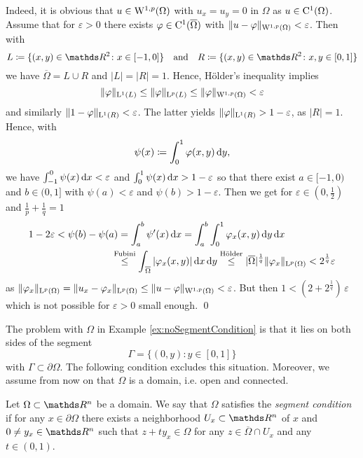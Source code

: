 \begin{ex}[Exercise]
  Indeed, it is obvious that $u \in \mathrm{W}^{1,p}(\Omega)$ with $u_x = u_y = 0$ in $\Omega$ as $u \in \mathrm{C}^1(\Omega)$.
  Assume that for $\varepsilon > 0$ there exists $\varphi \in \mathrm{C}^1(\overline\Omega)$ with $\| u - \varphi\|_{\mathrm{W}^{1,p}(\Omega)} < \varepsilon$.
  Then with
    $$
    L \coloneqq \{ (x,y) \in \R^2 \colon x \in [-1,0] \} \quad\text{and}\quad
    R \coloneqq \{ (x,y) \in \R^2 \colon x, y \in [0,1] \}
    $$
    we have $\overline\Omega = L \cup R$ and $|L| = |R| = 1$.
    Hence, Hölder's inequality implies
    $$
    \|\varphi\|_{\mathrm{L}^1(L)} 
    \leq \|\varphi\|_{\mathrm{L}^p(L)}
    \leq \|\varphi\|_{\mathrm{W}^{1,p}(\Omega)}
    < \varepsilon
    $$
    and similarly $\|1 - \varphi\|_{\mathrm{L}^1(R)} < \varepsilon$.
    The latter yields $\|\varphi\|_{\mathrm{L}^1(R)} > 1 - \varepsilon$, as $|R| = 1$.
    Hence, with
    $$
    \psi(x) \coloneqq \int_0^1 \varphi(x,y) \, {\operatorname{d}\!{y}},
    $$
    we have $\int_{-1}^0 \psi(x) \, {\operatorname{d}\!{x}} < \varepsilon$ and $\int_0^1 \psi(x) \, {\operatorname{d}\!{x}} > 1 - \varepsilon$ so that there exist $a \in [-1,0)$ and $b \in (0,1]$ with $\psi(a) < \varepsilon$ and $\psi(b) > 1 - \varepsilon$.
    Then we get for $\varepsilon \in (0,\frac{1}{2})$ and $\frac{1}{p} + \frac{1}{q} = 1$
    \begin{align*}
      1 - 2\varepsilon
      < \psi(b) - \psi(a)
      &= \int_a^b \psi'(x) \d x
      =\int_a^b \int_0^1 \varphi_x(x,y) \d y \d x \\
      &\hspace{-0.7em}\overset{\text{Fubini}}{\leq} \int_{\,\overline\Omega} |\varphi_x (x,y)| \d x \d y
      \overset{\text{Hölder}}{\leq} |\overline\Omega|^{\frac{1}{q}} \|\varphi_x\|_{\Ell^p(\Omega)}
      < 2^{\frac{1}{q}}\varepsilon
    \end{align*}
    as $\|\varphi_x\|_{\mathrm{L}^p(\Omega)} = \| u_x - \varphi_x\|_{\mathrm{L}^p(\Omega)} \leq \|u - \varphi\|_{\mathrm{W}^{1,p}(\Omega)} < \varepsilon$.
    But then $1 < (2 + 2^{\frac{1}{q}})\, \varepsilon$ which is not possible for $\varepsilon > 0$ small enough.  \qed
\end{ex}

The problem with $\Omega$ in Example \ref{ex:noSegmentCondition} is that it lies on both sides of the segment $$\Gamma = \{(0,y) \colon y \in [0,1]\}$$ with $\Gamma \subset \partial \Omega$.
The following condition excludes this situation.
Moreover, we assume from now on that $\Omega$ is a domain, i.e. open and connected.

\begin{defn}
  \label{defn:segmentCond}
  Let $\Omega \subset \R^n$ be a domain.
  We say that $\Omega$ satisfies the \emph{segment condition} if for any $x \in \partial\Omega$ there exists a neighborhood $U_x \subset \R^n$ of $x$ and $0 \neq y_x \in \R^n$ such that $z + t y_x \in \Omega$ for any $z \in \overline\Omega \cap U_x$ and any $t \in (0,1)$.
\end{defn}

